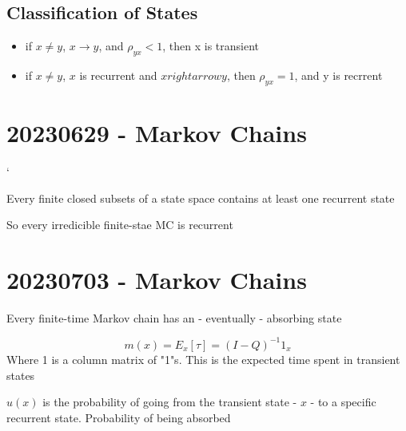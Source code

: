 \documentclass{report}
\begin{document}
    \section*{ Classification of States}
     {
      \begin{itemize}
        \item if $x \neq y$, $x \rightarrow y$, and $\rho_{yx} < 1$, then x is transient
        \item if $x \neq y$, $x$ is recurrent and $x rightarrow y$, then $\rho_{yx} = 1$, and y is recrrent
      \end{itemize}
    }
\chapter*{20230629 - Markov Chains}
    `
   {
    Every finite closed subsets of a state space contains at least one recurrent state

    So every irredicible finite-stae MC is recurrent
  }


\chapter*{20230703 - Markov Chains}

  Every finite-time Markov chain has an  - eventually - absorbing state

  \[ m(x) = E_x[\tau] = (I-Q)^{-1} 1_{x} \]
    Where 1 is a column matrix of "1"s.  This is the expected time
    spent in transient states

    $u(x)$ is the probability of going from the transient
    state - $x$ - to a specific recurrent state. Probability
    of being absorbed
\end{document}
